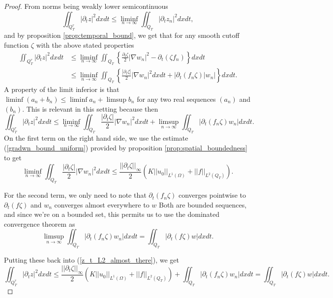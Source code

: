 \documentclass[11pt, a4paper]{article}
\begin{document}
\begin{proof}
From norms being weakly lower semicontinuous
\begin{equation}
\iint_{Q_T^\tau} |\partial_t z|^2 dxdt \leq \liminf_{n \to \infty} \iint_{Q_T} |\partial_t z_n|^2 dxdt,
\end{equation}
and by proposition \ref{prop:temporal_bound}, we get that for any smooth cutoff function $\zeta$ with the above stated properties
\begin{align*}
\iint_{Q_T^\tau} |\partial_t z|^2 dxdt &\leq \liminf_{n \to \infty} \iint_{Q_T} \left\{\frac{\partial_t \zeta}{2}|\nabla w_n|^2 - \partial_t (\zeta f_n)\right\} dxdt \\
&\leq \liminf_{n\to \infty}\iint_{Q_T} \left\{ \frac{|\partial_t \zeta|}{2}|\nabla w_n|^2dxdt + |\partial_t (f_n \zeta) |w_n| \right\}dxdt.
\end{align*}
A property of the limit inferior is that $\liminf(a_n + b_n) \leq \liminf a_n + \limsup b_n$ for any two real sequences $(a_n)$ and $(b_n)$. This is relevant in this setting because then
\begin{equation}
\label{z_t_L2_almost_there}
\iint_{Q_T^\tau} |\partial_t z|^2 dxdt\leq \liminf_{n\to \infty} \iint_{Q_T}\frac{|\partial_t \zeta|}{2}|\nabla w_n|^2dxdt + \limsup_{n \to \infty} \iint_{Q_T}|\partial_t (f_n \zeta) w_n| dxdt.
\end{equation}
On the first term on the right hand side, we use the estimate (\ref{gradwn_bound_uniform}) provided by proposition \ref{prop:spatial_boundedness} to get
\begin{equation*}
\liminf_{n\to \infty} \iint_{Q_T}\frac{|\partial_t \zeta|}{2}|\nabla w_n|^2dxdt \leq \frac{||\partial_t \zeta||_\infty}{2}\left( K||u_0||_{L^1(\Omega)} + ||f||_{L^2(Q_T)}\right).
\end{equation*}

For the second term, we only need to note that $\partial_t (f_n \zeta)$ converges pointwise to $\partial_t (f \zeta)$ and $w_n$ converges almost everywhere to $w$ Both are bounded sequences, and since we're on a bounded set, this permits us to use the dominated convergence theorem as
\begin{equation*}
\limsup_{n \to \infty} \iint_{Q_T}|\partial_t (f_n \zeta) w_n| dxdt = \iint_{Q_T}|\partial_t (f \zeta ) w| dxdt.
\end{equation*}

Putting these back into (\ref{z_t_L2_almost_there}), we get
\begin{equation}
\iint_{Q_T^\tau} |\partial_t z|^2 dxdt \leq \frac{||\partial_t \zeta||_\infty}{2}\left( K||u_0||_{L^1(\Omega)} + ||f||_{L^2(Q_T)}\right) + \iint_{Q_T}|\partial_t (f_n \zeta) w_n| dxdt = \iint_{Q_T}|\partial_t (f \zeta ) w| dxdt.
\end{equation}
\end{proof}
\end{document}

